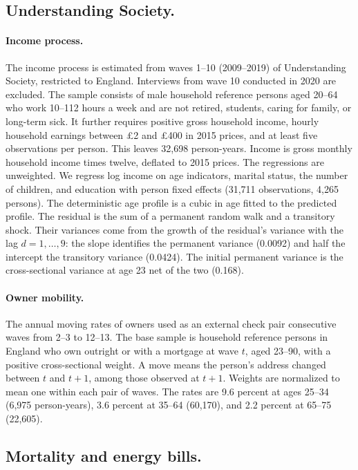 \subsection{Understanding Society.}\label{app:data-ukhls}

\paragraph{Income process.} The income process is estimated from waves 1--10
(2009--2019) of Understanding Society, restricted to England. Interviews from
wave 10 conducted in 2020 are excluded. The sample consists of male
household reference persons aged 20--64 who work 10--112 hours a week and
are not retired, students, caring for family, or long-term sick. It further
requires positive gross household income, hourly household earnings
between £2 and £400 in 2015 prices, and at least five observations per
person. This leaves 32,698 person-years. Income is gross monthly household
income times twelve, deflated to 2015 prices. The regressions are
unweighted. We regress log income on age indicators, marital status, the
number of children, and education with person fixed effects (31,711
observations, 4,265 persons). The deterministic age profile is a cubic in
age fitted to the predicted profile. The residual is the sum of a
permanent random walk and a transitory shock. Their variances come from
the growth of the residual's variance with the lag $d=1,\dots,9$: the
slope identifies the permanent variance (0.0092) and half the intercept
the transitory variance (0.0424). The initial permanent variance is the
cross-sectional variance at age 23 net of the two (0.168).

\paragraph{Owner mobility.} The annual moving rates of owners used as an
external check pair consecutive waves from 2--3 to 12--13. The base sample
is household reference persons in England who own outright or with a
mortgage at wave $t$, aged 23--90, with a positive cross-sectional weight.
A move means the person's address changed between $t$ and $t+1$, among
those observed at $t+1$. Weights are normalized to mean one within each pair
of waves. The rates are 9.6 percent at ages 25--34 (6,975 person-years),
3.6 percent at 35--64 (60,170), and 2.2 percent at 65--75 (22,605).

\subsection{Mortality and energy bills.}\label{app:data-other}

